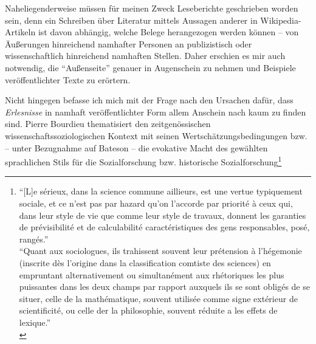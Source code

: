 \documentclass[fontsize=12pt]{scrartcl}
\begin{document}
Naheliegenderweise m\"ussen f\"ur meinen Zweck Leseberichte geschrieben worden sein, denn ein Schrei\-ben \"uber Li\-te\-ra\-tur mittels Aussagen an\-de\-rer in Wi\-ki\-pe\-dia-Artikeln ist davon abh\"angig, welche Belege herangezogen werden k\"onnen -- von \"Au{\ss}erungen hinreichend namhafter Per\-so\-nen an publizistisch oder wissenschaftlich hinreichend namhaften Stellen. Daher erschien es mir auch notwendig, die "`Au{\ss}enseite"' genauer in Augenschein zu nehmen und Beispiele ver\"of\-fent\-lichter Texte zu er\"ortern.

Nicht hingegen befasse ich mich mit der Frage nach den Ursachen daf\"ur, dass \textit{Erlesnisse} in namhaft ver\"of\-fent\-lichter Form allem Anschein nach kaum zu finden sind. Pierre Bourdieu thematisiert den zeitgen\"ossischen wissenschafts\-soziologischen Kontext mit seinen Wertsch\"a\-tzungs\-be\-dingungen bzw. -- unter Bezugnahme auf Bateson -- die evokative Macht des gew\"ahlten sprachlichen Stils f\"ur die Sozialfor\-schung bzw. historische Sozialfor\-schung\footnote{"`[L]e \flq s\'{e}rieux\frq, dans la science commune aillieurs, est une vertue typiquement sociale, et ce n'est pas par hazard qu'on l'accorde par priorit\'{e} \`{a} ceux qui, dans leur style de vie que comme leur style de travaux, donnent les garanties de pr\'{e}visibilit\'{e} et de calculabilit\'{e} caract\'{e}ristiques des gens \flq responsables\frq, pos\'{e}, rang\'{e}s."'\\
"`Quant aux sociologues, ils trahissent souvent leur pr\'{e}tension \`{a} l'h\'{e}gemonie (inscrite d\`{e}s l'origine dans la classification comtiste des sciences) en empruntant alternativement ou simultan\'{e}ment aux rh\'{e}toriques les plus puissantes dans les deux champs par rapport auxquels ils se sont oblig\'{e}s de se situer, celle de la math\'{e}matique, souvent utilis\'{e}e comme signe ext\'{e}rieur de scientificit\'{e}, ou celle der la philosophie, souvent r\'{e}duite a les effets de lexique."'\\
}
\end{document}
